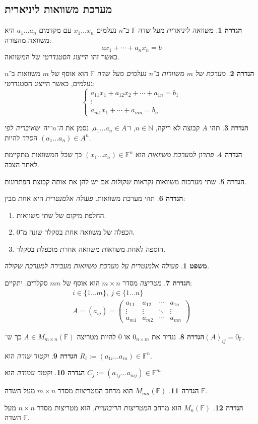 \documentclass[]{article}
\newcommand\N     {\mathbb{N}}
\newcommand\n     {$n$־יה\ }
\newcommand\F         {\mathbb{F}}
\newcommand\pms[1]    {\begin{pmatrix}
		#1
\end{pmatrix}}
\newtheorem{Theorem}{משפט}
\theoremstyle{definition}
\newtheorem{definition}{הגדרה}
\newcommand\theo  [1] {\begin{Theorem}#1\end{Theorem}}
\newcommand\defi  [1] {\begin{definition}#1\end{definition}}
\begin{document}
\begin{multicols}{2}
		\section{מערכת משוואות ליניארית}
		\defi{\textit{משוואה ליניארית} מעל שדה $\F$ ב־$n$ נעלמים $x_1 \dots x_n$ עם מקדמים $a_1 \dots a_n$ היא משוואה מהצורה: 
		\[ ax_1 + \cdots + a_nx_n = b \]
		כאשר זהו ה\textit{ייצוג הסטנדרטי} של המשוואה. 
		}
		\defi{\textit{מערכת של $m$ משוורות ב־$n$ נעלמים מעל שדה $\F$} הוא אוסף של $m$ משוואות ב־$n$ נעלמים, כאשר הייצוג הסטנדרטי: 
		\[ \begin{cases}
			a_{11}x_1 + a_{12}x_2 + \cdots + a_{1n} = b_1 \\
			\vdots \\
			a_{m1}x_{1} + \cdots + a_{mn} = b_n
		\end{cases} \]}
		\defi{תהי $A$ קבוצה לא ריקה, $n \in \N$, ו־$a_1 \dots a_n \in A$, נסמן את \textit{ה־\n שאיבריה לפי הסדר} להיות $(a_1 \dots a_n) \in A^n$. }
		\defi{\textit{פתרון למערכת משוואות} הוא $(x_1 \dots x_n) \in \F^n$ כך שכל המשוואות מתקיימת לאחר הצבה. }
		\defi{שתי מערכות משוואות נקראות \textit{שקולות} אם יש להן את אותה קבוצת הפתרונות. }
		\defi{תהי מערכת משוואות. \textit{פעולה אלמנטרית} היא אחת מבין: 
		\begin{enumerate}
			\item החלפת מיקום של שתי משוואות. 
			\item הכפלה של משוואה אחת בסקלר שונה מ־0. 
			\item הוספה לאחת משוואות משוואה אחרת מוכפלת בסקלר. 
		\end{enumerate}
		}
		\theo{פעולה אלמנטרית על מערכת משוואות מעבירה למערכת שקולה. }
		\defi{\textit{מטריצה} מסדר $m \times n$ הוא אוסף של $mn$ סקלרים. יתקיים: 
		\begin{gather*}
			i \in \{1 \dots m\}, \ j \in \{1 \dots n\} \\ 
			A = (a_{ij}) = \pms{a_{11} & a_{12} & \cdots & a_{1n} \\ \vdots &\vdots & \ddots & \vdots \\ a_{m1} & a_{m2} & \cdots & a_{mn}}
		\end{gather*}}
		\defi{נגדיר את $0_{n \times m}$ או $0$ להיות מטריצה $A \in M_{m \times n}(\F)$ כך ש־$(A)_{ij} = 0_\F$. }
		\defi{\textit{וקטור שורה} הוא $R_i := (a_{1i} \dots a_{in}) \in \F^{n}$. }
		\defi{\textit{וקטור עמודה} הוא $C_j := (a_{1j} \dots a_{mj}) \in \F^{m}$. }
		\defi{$M_{mn}(\F)$ הוא מרחב המטריצות מסדר $m \times n$ מעל השדה $\F$. }
		\defi{$M_n(\F)$ הוא מרחב ה\textit{מטריצות הריבועיות}, הוא מטריצות מסדר $n \times n$ מעל השדה $\F$. }

\end{multicols}
\end{document}
